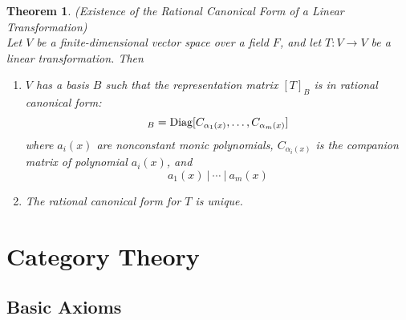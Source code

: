 \documentclass[a4paper,8pt]{article}
\newcommand{\hlt}[1]{\textit{{\color{blue}#1}}}
\theoremstyle{theorem}
\newtheorem{theorem}{Theorem}[subsection]
\begin{document}
\begin{theorem}
\label{thm:ercflt}
\hlt{(Existence of the Rational Canonical Form of a Linear Transformation)}\\
Let $V$ be a finite-dimensional vector space over a field $F$, and let $T: V \rightarrow V$ be a linear transformation. Then
\begin{enumerate}[label=(\roman*)]
\item $V$ has a basis $B$ such that the representation matrix $[T]_B$ is in rational canonical form:
\begin{equation}
[T]_B = \textnormal{Diag}[C_{\alpha_1 (x)}, \ldots, C_{\alpha_m (x)}] \nonumber
\end{equation}
where $a_i(x)$ are nonconstant monic polynomials, $C_{\alpha_i (x)}$ is the companion matrix of polynomial $a_i(x)$, and
\begin{equation}
a_1(x) \ | \ \cdots \ | \ a_m(x) \nonumber
\end{equation}
\item The rational canonical form for $T$ is unique.
\end{enumerate}
\end{theorem}

\newpage

\section{Category Theory}
\subsection{Basic Axioms}
\end{document}
